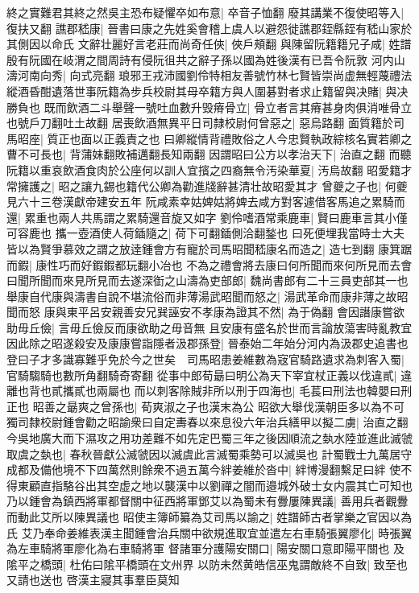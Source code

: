 終之實難君其終之然吳主恐布疑懼卒如布意|{
	卒音子恤翻}
廢其講業不復使昭等入|{
	復扶又翻}
譙郡嵇康|{
	晉書曰康之先姓奚會稽上虞人以避怨徙譙郡銍縣銍有嵇山家於其側因以命氏}
文辭壮麗好言老莊而尚奇任俠|{
	俠戶頰翻}
與陳留阮籍籍兄子咸|{
	姓譜殷有阮國在岐渭之間周詩有侵阮徂共之辭子孫以國為姓後漢有已吾令阮敦}
河内山濤河南向秀|{
	向式亮翻}
琅邪王戎沛國劉伶特相友善號竹林七賢皆崇尚虚無輕蔑禮法縱酒昏酣遺落世事阮籍為步兵校尉其母卒籍方與人圍碁對者求止籍留與决賭|{
	與决勝負也}
既而飲酒二斗舉聲一號吐血數升毁瘠骨立|{
	骨立者言其瘠甚身肉俱消唯骨立也號戶刀翻吐土故翻}
居喪飲酒無異平日司隸校尉何曾惡之|{
	惡烏路翻}
面質籍於司馬昭座|{
	質正也面以正義責之也}
曰卿縱情背禮敗俗之人今忠賢執政綜核名實若卿之曹不可長也|{
	背蒲妹翻敗補邁翻長知兩翻}
因謂昭曰公方以孝治天下|{
	治直之翻}
而聽阮籍以重哀飲酒食肉於公座何以訓人宜擯之四裔無令汚染華夏|{
	汚烏故翻}
昭愛籍才常擁護之|{
	昭之讓九錫也籍代公卿為勸進牋辭甚清壮故昭愛其才}
曾夔之子也|{
	何夔見六十三卷漢獻帝建安五年}
阮咸素幸姑婢姑將婢去咸方對客遽借客馬追之累騎而還|{
	累重也兩人共馬謂之累騎還音旋又如字}
劉伶嗜酒常乘鹿車|{
	賢曰鹿車言其小僅可容鹿也}
攜一壺酒使人荷鍤隨之|{
	荷下可翻鍤側洽翻鍫也}
曰死便埋我當時士大夫皆以為賢爭慕效之謂之放逹鍾會方有寵於司馬昭聞嵇康名而造之|{
	造七到翻}
康箕踞而鍜|{
	康性巧而好鍜鍜都玩翻小冶也}
不為之禮會將去康曰何所聞而來何所見而去會曰聞所聞而來見所見而去遂深衘之山濤為吏部郎|{
	魏尚書郎有二十三員吏部其一也}
舉康自代康與濤書自說不堪流俗而非薄湯武昭聞而怒之|{
	湯武革命而康非薄之故昭聞而怒}
康與東平呂安親善安兄巽誣安不孝康為證其不然|{
	為于偽翻}
會因譖康嘗欲助毋丘儉|{
	言毋丘儉反而康欲助之毋音無}
且安康有盛名於世而言論放蕩害時亂教宜因此除之昭遂殺安及康康嘗詣隱者汲郡孫登|{
	晉泰始二年始分河内為汲郡史追書也}
登曰子才多識寡難乎免於今之世矣　司馬昭患姜維數為宼官騎路遺求為刺客入蜀|{
	官騎騶騎也數所角翻騎奇寄翻}
從事中郎荀朂曰明公為天下宰宜杖正義以伐違貳|{
	違離也背也貳攜貳也兩屬也}
而以刺客除賊非所以刑于四海也|{
	毛萇曰刑法也韓嬰曰刑正也}
昭善之朂爽之曾孫也|{
	荀爽淑之子也漢末為公}
昭欲大舉伐漢朝臣多以為不可獨司隸校尉鍾會勸之昭諭衆曰自定夀春以來息役六年治兵繕甲以擬二虜|{
	治直之翻}
今吳地廣大而下濕攻之用功差難不如先定巴蜀三年之後因順流之埶水陸並進此滅虢取虞之埶也|{
	春秋晉獻公滅虢因以滅虞此言滅蜀乘勢可以滅吳也}
計蜀戰士九萬居守成都及備他境不下四萬然則餘衆不過五萬今絆姜維於沓中|{
	絆博漫翻繫足曰絆}
使不得東顧直指駱谷出其空虚之地以襲漢中以劉禪之闇而邉城外破士女内震其亡可知也乃以鍾會為鎮西將軍都督關中征西將軍鄧艾以為蜀未有釁屢陳異議|{
	善用兵者觀釁而動此艾所以陳異議也}
昭使主簿師纂為艾司馬以諭之|{
	姓譜師古者掌樂之官因以為氏}
艾乃奉命姜維表漢主聞鍾會治兵關中欲規進取宜並遣左右車騎張翼廖化|{
	時張翼為左車騎將軍廖化為右車騎將軍}
督諸軍分護陽安關口|{
	陽安關口意即陽平關也}
及隂平之橋頭|{
	杜佑曰隂平橋頭在文州界}
以防未然黄皓信巫鬼謂敵終不自致|{
	致至也又請也送也}
啓漢主寢其事羣臣莫知

